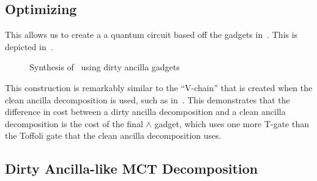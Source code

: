 \subsection{Optimizing }

This allows us to create a a quantum circuit based off the gadgets in~. This is depicted
in~. 

\begin{figure}[t]
  \centering
  \scalebox{1.0} {
    
  }
  \caption{Synthesis of~ using dirty ancilla gadgets}
  \label{fig-mct-gadgets}
\end{figure}

This construction is remarkably similar to the ``V-chain'' that is created when the clean ancilla 
decomposition is used, such as in~. This demonstrates that the difference in
cost between a dirty ancilla decomposition and a clean ancilla decomposition is the cost of the
final $\wedge$ gadget, which uses one more T-gate than the Toffoli gate that the clean ancilla
decomposition uses.

\subsection{Dirty Ancilla-like MCT Decomposition}
